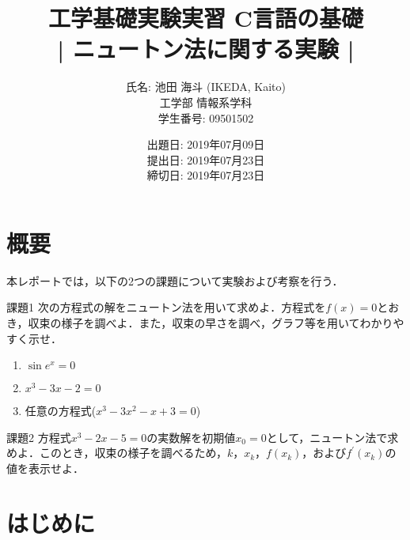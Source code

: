 \documentclass[12pt]{jarticle}
\renewcommand  \[  {\begin{eqnarray}}
\renewcommand  \]  {\end{eqnarray}}
\begin{document}
\title{工学基礎実験実習 C言語の基礎 \\ | ニュートン法に関する実験 |}

\date{出題日: 2019年07月09日 \\
      提出日: 2019年07月23日 \\
      締切日: 2019年07月23日 \\}

\author{氏名: 池田 海斗 (IKEDA, Kaito) \\
        工学部 情報系学科 \\
        学生番号: 09501502}

\maketitle



\section{概要}

本レポートでは，以下の2つの課題について実験および考察を行う．

\begin{description}
\item 課題1
次の方程式の解をニュートン法を用いて求めよ．方程式を$f(x)=0$とおき，収束の様子を調べよ．また，収束の早さを調べ，グラフ等を用いてわかりやすく示せ．

\begin{enumerate}
\item $\sin e^x=0$
\item $x^3-3x-2=0$
\item 任意の方程式($x^3-3x^2-x+3=0$)
\end{enumerate}

\item 課題2
方程式$x^3-2x-5=0$の実数解を初期値$x_0=0$として，ニュートン法で求めよ．このとき，収束の様子を調べるため，$k$，$x_k$，$f(x_k)$，および$f^{\prime}(x_k)$の値を表示せよ．
\end{description}



\section{はじめに}
\end{document}
